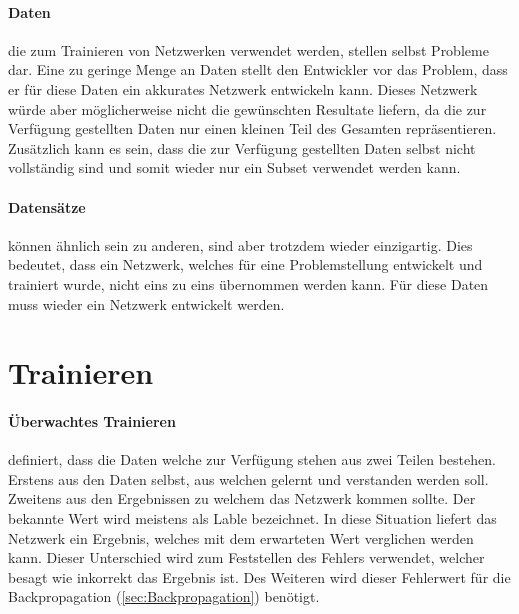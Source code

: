 
\paragraph{Daten} die zum Trainieren von Netzwerken verwendet werden, stellen selbst Probleme dar.
Eine zu geringe Menge an Daten stellt den Entwickler vor das Problem, dass er für diese Daten ein akkurates Netzwerk entwickeln kann.
Dieses Netzwerk würde aber möglicherweise nicht die gewünschten Resultate liefern, da die zur Verfügung gestellten Daten nur einen kleinen Teil des Gesamten repräsentieren.
Zusätzlich kann es sein, dass die zur Verfügung gestellten Daten selbst nicht vollständig sind und somit wieder nur ein Subset verwendet werden kann.

\paragraph{Datensätze} können ähnlich sein zu anderen, sind aber trotzdem wieder einzigartig. 
Dies bedeutet, dass ein Netzwerk, welches für eine Problemstellung entwickelt und trainiert wurde, nicht eins zu eins übernommen werden kann.
Für diese Daten muss wieder ein Netzwerk entwickelt werden.

\section{Trainieren}

\paragraph{Überwachtes Trainieren} definiert, dass die Daten welche zur Verfügung stehen aus zwei Teilen bestehen.
Erstens aus den Daten selbst, aus welchen gelernt und verstanden werden soll.
Zweitens aus den Ergebnissen zu welchem das Netzwerk kommen sollte.
Der bekannte Wert wird meistens als Lable bezeichnet. 
In diese Situation liefert das Netzwerk ein Ergebnis, welches mit dem erwarteten Wert verglichen werden kann.
Dieser Unterschied wird zum Feststellen des Fehlers verwendet, welcher besagt wie inkorrekt das Ergebnis ist.
Des Weiteren wird dieser Fehlerwert für die Backpropagation (\ref{sec:Backpropagation}) benötigt.


